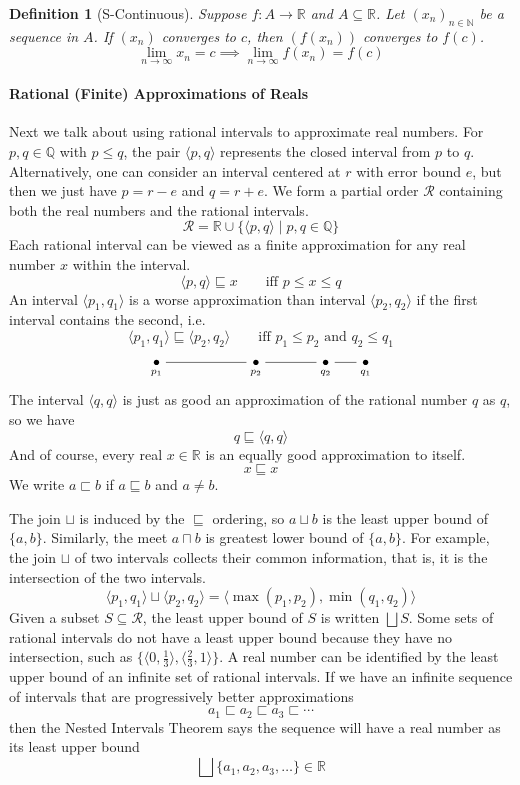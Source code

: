 \documentclass{article}
\newtheorem{definition}{Definition}%
\newcommand{\Reals}[0]{\mathbb{R}}
\newcommand{\Rats}[0]{\mathbb{Q}}
\begin{document}
\begin{definition}[S-Continuous]
  Suppose $f : A \to \Reals$ and $A \subseteq \Reals$.
  Let $(x_n)_{n \in \mathbb{N}}$ be a sequence in $A$.
  If $(x_n)$ converges to $c$, then $(f(x_n))$ converges to $f(c)$.
  \[
    \lim_{n\to\infty} x_n = c \implies
    \lim_{n\to\infty} f(x_n) = f(c)
  \]
\end{definition}


\paragraph{Rational (Finite) Approximations of Reals}

Next we talk about using rational intervals to approximate real
numbers. For $p,q \in \Rats$ with $p \leq q$, the pair $\langle p,q \rangle$
represents the closed interval from $p$ to $q$. Alternatively, one can
consider an interval centered at $r$ with error bound $e$, but then we
just have $p = r-e$ and $q = r+e$.  We form a partial order
$\mathcal{R}$ containing both the real numbers and the rational
intervals.
\[
   \mathcal{R} = \Reals \cup \{ \langle p,q \rangle \mid p,q \in \Rats \}
\]
Each rational interval can be viewed as a finite approximation for any
real number $x$ within the interval.
\[
  \langle p,q \rangle  \sqsubseteq x \qquad \text{iff } p \leq x \leq q
\]
An interval $\langle p_1,q_1 \rangle$ is a worse approximation than interval
$\langle p_2,q_2 \rangle$ if the first interval contains the second, i.e.
\[
  \langle p_1,q_1 \rangle \sqsubseteq \langle p_2,q_2 \rangle
  \qquad
  \text{iff }
  p_1 \leq p_2
  \text{ and }
  q_2 \leq q_1
\]
\[
\xymatrix@=15pt{
  \underset{p_1}{\bullet} \ar@{-}[rrr] & & & 
  \underset{p_2}{\bullet} \ar@{-}[rr] & & 
  \underset{q_2}{\bullet} \ar@{-}[r] & 
  \underset{q_1}{\bullet}
}
\]
The interval $\langle q,q \rangle$ is just as good an approximation of the rational
number $q$ as $q$, so we have
\[
  q \sqsubseteq \langle q,q \rangle
\]
And of course, every real $x \in \Reals$ is an equally good
approximation to itself.
\[
  x \sqsubseteq x  
\]
We write $a \sqsubset b$ if $a \sqsubseteq b$ and $a \neq b$.


The join $\sqcup$ is induced by the $\sqsubseteq$ ordering, so $a
\sqcup b$ is the least upper bound of $\{a,b\}$.  Similarly, the meet
$a \sqcap b$ is greatest lower bound of $\{a,b\}$.  For example, the
join $\sqcup$ of two intervals collects their common information, that
is, it is the intersection of the two intervals.
\[
  \langle p_1,q_1 \rangle \sqcup \langle p_2,q_2 \rangle = \langle \max(p_1, p_2), \min(q_1, q_2) \rangle
\]
Given a subset $S \subseteq \mathcal{R}$, the least upper bound of $S$
is written $\bigsqcup S$.  Some sets of rational intervals do not have
a least upper bound because they have no intersection, such as $\{
\langle 0,\frac{1}{3} \rangle, \langle \frac{2}{3},1 \rangle \}$.  A
real number can be identified by the least upper bound of an infinite
set of rational intervals.  If we have an infinite sequence of
intervals that are progressively better approximations
\[
a_1 \sqsubset a_2 \sqsubset a_3  \sqsubset \cdots
\]
then the Nested Intervals Theorem says the sequence will have a real
number as its least upper bound
\[
  \bigsqcup \{ a_1,a_2,a_3,\ldots \} \in \Reals
\]
\end{document}

